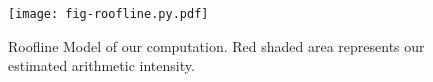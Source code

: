 \begin{figure}[h]

  \centering
  \texttt{[image: fig-roofline.py.pdf]}

  \caption{Roofline Model of our computation. Red shaded area represents our estimated arithmetic intensity.}

  \label{fig-roofline}

\end{figure}